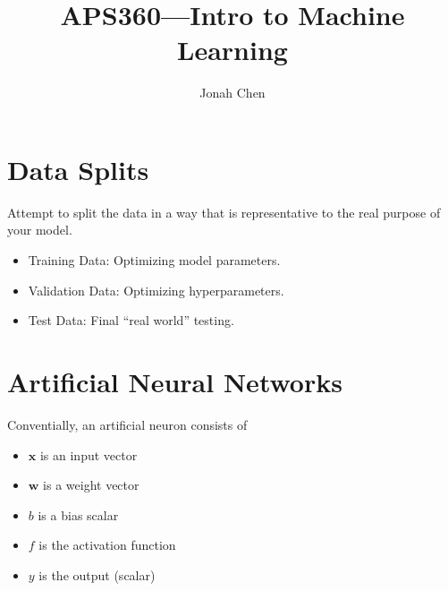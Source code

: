 \documentclass[a4paper]{article}
\title{APS360---Intro to Machine Learning}
\author{Jonah Chen}
\numberwithin{equation}{section}
\begin{document}
\sffamily
\maketitle
\tableofcontents

\section{Data Splits}
Attempt to split the data in a way that is representative to the real purpose of your model.
\begin{itemize}
    \item Training Data: Optimizing model parameters.
    \item Validation Data: Optimizing hyperparameters.
    \item Test Data: Final ``real world'' testing.
\end{itemize}

\section{Artificial Neural Networks}
Conventially, an artificial neuron consists of 
\begin{itemize}
    \item $\mathbf{x}$ is an input vector
    \item $\mathbf{w}$ is a weight vector
    \item $b$ is a bias scalar
    \item $f$ is the activation function
    \item $y$ is the output (scalar)
\end{itemize}
\end{document}
